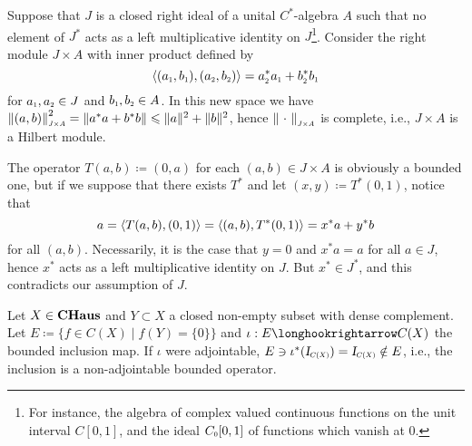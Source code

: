 \begin{contraexemplo}
    Suppose that $J$ is a closed right ideal of a unital $C^{*}$-algebra $A$ such that no element of $J^{*}$ acts as a left multiplicative identity on $J$\footnote{For instance, the algebra of complex valued continuous functions on the unit interval $C[0,1]$, and the ideal $\sub C0[0,1]$ of functions which vanish at 0.}. Consider the right module $J \times A$ with inner product defined by 
    \begin{equation*}
    \inner{\left(\sub a{1}, \sub b{1}\right)}{\left(\sub a{2}, \sub b{2}\right)} = \sub a{2}^{*} \sub a{1}+\sub b{2}^{*} \sub b{1}
    \end{equation*}
    for $\sub a1, \sub a2 \in J$ and $\sub b1, \sub b2 \in A$. In this new space we have $\sub{\|(a, b)\|}{J\times A}^2=\left\|a^{*} a+b^* b\right\|\leq \|a\|^{2}+\|b\|^{2}$, hence $\sub{\|\come\|}{J\times A}$ is complete, i.e., $J\times A$ is a Hilbert module. 
    
    The operator $T(a,b)\coloneqq (0,a)$ for each $(a,b) \in J\times A$ is obviously a bounded one, but if we suppose that there exists $T^*$ and let $(x,y) \coloneqq T^*(0,1)$, notice that
    \begin{equation*}
        a = \langle {T(a,b)},{(0,1)}\rangle = \langle {(a,b)},{T^*(0,1)}\rangle = x^*a+y^*b
    \end{equation*}
    for all $(a,b)$. Necessarily, it is the case that $y=0$ and $x^*a=a$ for all $a\in J$, hence $x^*$ acts as a left multiplicative identity on $J$. But $x^* \in J^*$, and this contradicts our assumption of $J$.
\end{contraexemplo}
    
\begin{contraexemplo}
    Let $X\in \boldsymbol{\operatorname{CHaus}}$ and $Y \subset X$ a closed non-empty subset with dense complement. Let $E \coloneqq \big\{f \in C(X) \mid f(Y) = \{0\}\big\}$ and $\iota : E \longhookrightarrow C(X)$ the bounded inclusion map. If $\iota$ were adjointable, $E \ni \iota^*(\sub\Id{C(X)}) = \sub\Id{C(X)} \notin E$, i.e., the inclusion is a non-adjointable bounded operator.
\end{contraexemplo}
        
